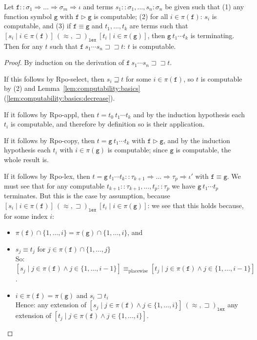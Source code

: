 \documentclass[a4paper,USenglish,cleveref,autoref,thm-restate]{lipics-v2021}
\newcommand{\arrtype}{\Rightarrow}
\newcommand{\grmain}{\sqsupset}
\newcommand{\geqmain}{\sqsupseteq}
\newcommand{\ismain}{\approx}
\newcommand{\rpomain}{\sqsupset\!\!\sqsupset}
\newcommand{\grpred}{\rhd}
\newcommand{\eqpred}{\equiv}
\newcommand{\symb}[1]{\mathtt{#1}}
\newcommand{\afun}{\symb{f}}
\newcommand{\bfun}{\symb{g}}
\newcommand{\atype}{\sigma}
\newcommand{\btype}{\tau}
\newcommand{\asort}{\iota}
\newcommand{\bsort}{\iota'}
\newcommand{\filter}{\pi}
\begin{document}
\begin{lemma}\label{lem:wellfounded:induction}
Let $\afun :: \atype_1 \arrtype \dots \arrtype \atype_m \arrtype \asort$ and terms $s_1 :: \atype_1,
\dots,s_n : \atype_n$ be given such that
(1) any function symbol $\bfun$ with $\afun \grpred \bfun$ is computable;
(2) for all $i \in \filter(\afun)$: $s_i$ is computable, and
(3) if $\afun \eqpred \bfun$ and $t_1,\dots,t_k$ are terms such that $[s_i \mid i \in 
  \filter(\afun)]\ (\ismain,\grmain)_{\mathtt{lex}}\ [t_i \mid i \in \filter(\bfun)]$,
  then $\bfun\ t_1 \cdots t_k$ is terminating.
Then for any $t$ such that $\afun\ s_1 \cdots s_n \rpomain t$: $t$ is computable.
\end{lemma}

\begin{proof}
By induction on the derivation of $\afun\ s_1 \cdots s_n \rpomain t$.

If this follows by Rpo-select, then $s_i \geqmain t$ for some $i \in \filter(\afun)$, so $t$ is
computable by (2) and Lemma~\ref{lem:computability:basics}(\ref{lem:computability:basics:decrease}).

If it follows by Rpo-appl, then $t = t_0\ t_1 \cdots t_k$ and by the induction hypothesis each
$t_i$ is computable, and therefore by definition so is their application.

If it follows by Rpo-copy, then $t = \bfun\ t_1 \cdots t_k$ with $\afun \grpred \bfun$, and by the
induction hypothesis each $t_i$ with $i \in \filter(\bfun)$ is computable; since $\bfun$ is
computable, the whole result is.

If it follows by Rpo-lex, then $t = \bfun\ t_1 \cdots t_k :: \btype_{k+1} \arrtype \dots \arrtype
\btype_p \arrtype \bsort$ with $\afun \eqpred \bfun$.  We must see that for any computable $t_{k+1}
:: \btype_{k+1},\dots,t_p :: \btype_p$ we have $\bfun\ t_1 \cdots t_p$ terminates.  But this is the
case by assumption, because $[s_i \mid i \in \filter(\afun)]\ (\ismain,\grmain)_{\mathtt{lex}}\ 
[t_i \mid i \in \filter(\bfun)]$: we see that this holds because, for some index $i$:
\begin{itemize}
\item $\filter(\afun) \cap \{1,\dots,i\} = \filter(\bfun) \cap \{1,\dots,i\}$, and
\item $s_j \eqpred t_j$ for $j \in \filter(\afun) \cap \{1,\dots,j\}$ \\
  So: $[s_j \mid j \in \filter(\afun) \wedge j \in \{1,\dots,i-1\}] \eqpred_{\text{placewise}}
  [t_j \mid j \in \filter(\afun) \wedge j \in \{1,\dots,i-1\}]$.
\item $i \in \filter(\afun) = \filter(\bfun)$ and $s_i \grmain t_i$ \\
  Hence: any extension of $[s_j \mid j \in \filter(\afun) \wedge j \in \{1,\dots,i\}]\ 
  (\ismain,\grmain)_{\mathtt{lex}}$ any extension of
  $[t_j \mid j \in \filter(\afun) \wedge j \in \{1,\dots,i\}]$.
  \qedhere
\end{itemize}
\end{proof}
\end{document}
